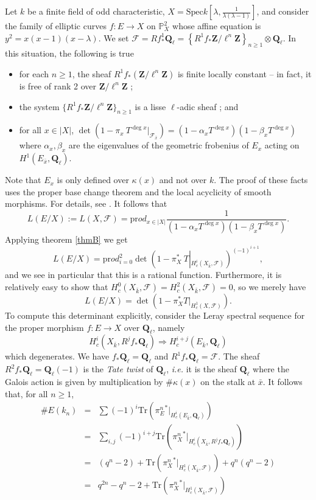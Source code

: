 Let $k$ be a finite field of odd characteristic, $X=\text{Spec} k\left[\lambda, \frac{1}{\lambda(\lambda-1)}\right]$, and consider the family of elliptic curves  $f: E\to X$ on $\mathbb P^2_X$ whose affine equation is $y^2 = x(x-1)(x-\lambda)$. We set $\mathcal{F} = Rf_*^1\mathbf{Q}_\ell = \left\{R^1f_*\mathbf{Z}/\ell^n\mathbf{Z}\right\}_{n\geq 1}\otimes \mathbf{Q}_\ell$. In this situation, the following is true
\begin{itemize}	
\item for each $n \geq 1$, the sheaf $R^1f_*(\mathbf{Z}/\ell^n\mathbf{Z})$ is finite locally constant -- in fact, it is free of rank 2 over $\mathbf{Z}/\ell^n\mathbf{Z}$ ;
\item the system $\{R^1f_*\mathbf{Z}/\ell^n\mathbf{Z}\}_{n\geq 1}$ is a lisse $\ell$-adic sheaf ; and
\item for all $x\in |X|$, $\det\left(1-\pi_x\ T^{\deg x}\big|_{\mathcal{F}_{\bar x}}\right) = (1-\alpha_x T^{\deg x})(1-\beta_x T^{\deg x })$ where $\alpha_x, \beta_x$ are the eigenvalues of the geometric frobenius of $E_x$ acting on $H^1(E_{\bar x}, \mathbf{Q}_\ell)$. 
\end{itemize}
Note that $E_x$ is only defined over $\kappa(x)$ and not over $k$. The proof of these facts uses the proper base change theorem and the local acyclicity of smooth morphisms. For details, see \cite{SGA4.5}. It follows that
$$
L(E/X) := L(X, \mathcal{F}) = \text{pr}od_{x\in |X|} \frac{1}{(1-\alpha_xT^{\deg x})(1-\beta_xT^{\deg x })} .
$$
Applying theorem \ref{thmB} we get
$$
L(E/X) = \text{pr}od_{i=0}^2\det\left(1-\pi_X^*\ T\left|_{H_c^i(X_{\bar k}, \mathcal{F})}\right.\right)^{(-1)^{i+1}},
$$
and we see in particular that this is a rational function. Furthermore, it is relatively easy to show that $H_c^0(X_{\bar k}, \mathcal{F}) = H_c^2(X_{\bar k}, \mathcal{F}) = 0$, so we merely have
$$
L(E/X) = \det\left(1-\pi_X^*T\big|_{H_c^1(X, \mathcal{F})}\right).
$$
To compute this determinant explicitly, consider the Leray spectral sequence for the proper morphism $f:E \to X$ over $\mathbf{Q}_\ell$, namely
$$
H_c^i(X_{\bar k}, R^jf_*\mathbf{Q}_\ell) \Rightarrow H_c^{i+j}(E_{\bar k},\mathbf{Q}_\ell)
$$
which degenerates. We have $f_*\mathbf{Q}_\ell=\mathbf{Q}_\ell$ and $R^1f_*\mathbf{Q}_\ell = \mathcal{F}$. The sheaf $R^2f_*\mathbf{Q}_\ell = \mathbf{Q}_\ell(-1)$ is the \emph{Tate twist} of $\mathbf{Q}_\ell$, {\it i.e.} it is the sheaf $\mathbf{Q}_\ell$ where the Galois action is given by multiplication by $\#\kappa(x)$ on the stalk at $\bar x$.  It follows that,  for all $n\geq 1$,
\begin{eqnarray*}
\# E(k_n) & = & \sum(-1)^i\text{Tr}\left({\pi_E^n}^*\big|_{H_c^i(E_{\bar k}, \mathbf{Q}_\ell)}\right)\\
& = & \sum_{i, j}(-1)^{i+j}\text{Tr}\left({\pi^n_X}^*\big|_{H_c^i(X_{\bar k}, R^jf_*\mathbf{Q}_\ell)}\right)\\
& = & (q^n-2) + \text{Tr}\left( {\pi_X^n}^*\big|_{H_c^1(X_{\bar k}, \mathcal{F})}\right)+ q^n (q^n-2)\\
& = & q^{2n} - q^n-2 +\text{Tr}\left( {\pi_X^n}^*\big|_{H_c^1(X_{\bar k}, \mathcal{F})}\right)
\end{eqnarray*}
